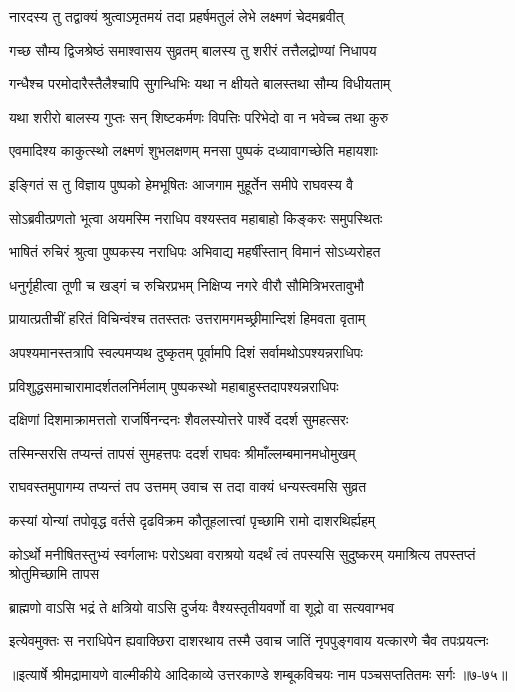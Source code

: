 
\twolineshloka
{नारदस्य तु तद्वाक्यं श्रुत्वाऽमृतमयं तदा}
{प्रहर्षमतुलं लेभे लक्ष्मणं चेदमब्रवीत्} %

\twolineshloka
{गच्छ सौम्य द्विजश्रेष्ठं समाश्वासय सुव्रतम्}
{बालस्य तु शरीरं तत्तैलद्रोण्यां निधापय} %

\twolineshloka
{गन्धैश्च परमोदारैस्तैलैश्चापि सुगन्धिभिः}
{यथा न क्षीयते बालस्तथा सौम्य विधीयताम्} %

\twolineshloka
{यथा शरीरो बालस्य गुप्तः सन् शिष्टकर्मणः}
{विपत्तिः परिभेदो वा न भवेच्च तथा कुरु} %

\twolineshloka
{एवमादिश्य काकुत्स्थो लक्ष्मणं शुभलक्षणम्}
{मनसा पुष्पकं दध्यावागच्छेति महायशाः} %

\twolineshloka
{इङ्गितं स तु विज्ञाय पुष्पको हेमभूषितः}
{आजगाम मुहूर्तेन समीपे राघवस्य वै} %

\twolineshloka
{सोऽब्रवीत्प्रणतो भूत्वा अयमस्मि नराधिप}
{वश्यस्तव महाबाहो किङ्करः समुपस्थितः} %

\twolineshloka
{भाषितं रुचिरं श्रुत्वा पुष्पकस्य नराधिपः}
{अभिवाद्य महर्षींस्तान् विमानं सोऽध्यरोहत} %

\twolineshloka
{धनुर्गृहीत्वा तूणी च खड्गं च रुचिरप्रभम्}
{निक्षिप्य नगरे वीरौ सौमित्रिभरतावुभौ} %

\twolineshloka
{प्रायात्प्रतीचीं हरितं विचिन्वंश्च ततस्ततः}
{उत्तरामगमच्छ्रीमान्दिशं हिमवता वृताम्} %

\twolineshloka
{अपश्यमानस्तत्रापि स्वल्पमप्यथ दुष्कृतम्}
{पूर्वामपि दिशं सर्वामथोऽपश्यन्नराधिपः} %

\twolineshloka
{प्रविशुद्धसमाचारामादर्शतलनिर्मलाम्}
{पुष्पकस्थो महाबाहुस्तदापश्यन्नराधिपः} %

\twolineshloka
{दक्षिणां दिशमाक्रामत्ततो राजर्षिनन्दनः}
{शैवलस्योत्तरे पार्श्वे ददर्श सुमहत्सरः} %

\twolineshloka
{तस्मिन्सरसि तप्यन्तं तापसं सुमहत्तपः}
{ददर्श राघवः श्रीमाँल्लम्बमानमधोमुखम्} %

\twolineshloka
{राघवस्तमुपागम्य तप्यन्तं तप उत्तमम्}
{उवाच स तदा वाक्यं धन्यस्त्वमसि सुव्रत} %

\twolineshloka
{कस्यां योन्यां तपोवृद्ध वर्तसे दृढविक्रम}
{कौतूहलात्त्वां पृच्छामि रामो दाशरथिर्ह्यहम्} %

\threelineshloka
{कोऽर्थो मनीषितस्तुभ्यं स्वर्गलाभः परोऽथवा}
{वराश्रयो यदर्थं त्वं तपस्यसि सुदुष्करम्}
{यमाश्रित्य तपस्तप्तं श्रोतुमिच्छामि तापस} %

\twolineshloka
{ब्राह्मणो वाऽसि भद्रं ते क्षत्रियो वाऽसि दुर्जयः}
{वैश्यस्तृतीयवर्णो वा शूद्रो वा सत्यवाग्भव} %

\twolineshloka
{इत्येवमुक्तः स नराधिपेन ह्यवाक्छिरा दाशरथाय तस्मै}
{उवाच जातिं नृपपुङ्गवाय यत्कारणे चैव तपःप्रयत्नः} %


॥इत्यार्षे श्रीमद्रामायणे वाल्मीकीये आदिकाव्ये उत्तरकाण्डे शम्बूकविचयः नाम पञ्चसप्ततितमः सर्गः ॥७-७५॥
